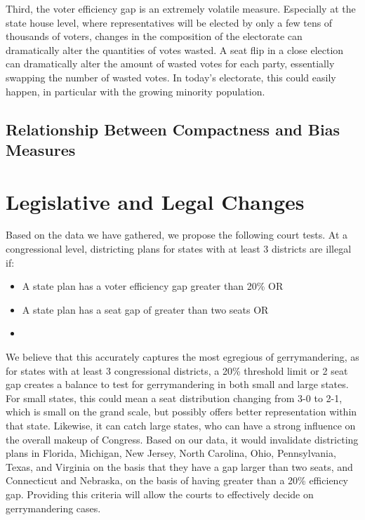 \documentclass[12pt]{article}
\begin{document}
  Third, the voter efficiency gap is an extremely volatile measure.  Especially at the state house level, where representatives will be elected by only a few tens of thousands of voters, changes in the composition of the electorate can dramatically alter the quantities of votes wasted.  A seat flip in a close election can dramatically alter the amount of wasted votes for each party, essentially swapping the number of wasted votes.  In today's electorate, this could easily happen, in particular with the growing minority population.

  \subsection{Relationship Between Compactness and Bias Measures}


  \section{Legislative and Legal Changes}

  Based on the data we have gathered, we propose the following court tests.  At a congressional level, districting plans for states with at least 3 districts are illegal if:
  \begin{itemize}
  \item A state plan has a voter efficiency gap greater than 20\% OR
  \item A state plan has a seat gap of greater than two seats OR
  \item%
  \end{itemize}

  We believe that this accurately captures the most egregious of gerrymandering, as for states with at least 3 congressional districts, a 20\% threshold limit or 2 seat gap creates a balance to test for gerrymandering in both small and large states.  For small states, this could mean a seat distribution changing from 3-0 to 2-1, which is small on the grand scale, but possibly offers better representation within that state. Likewise, it can catch large states, who can have a strong influence on the overall makeup of Congress.  Based on our data, it would invalidate districting plans in Florida, Michigan, New Jersey, North Carolina, Ohio, Pennsylvania, Texas, and Virginia on the basis that they have a gap larger than two seats, and Connecticut and Nebraska, on the basis of having greater than a 20\% efficiency gap. Providing this criteria will allow the courts to effectively decide on gerrymandering cases.
\end{document}
